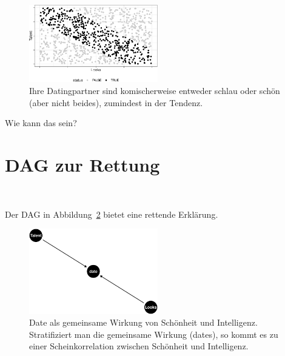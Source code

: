 \documentclass[
  a4paper,
  DIV=11]{scrreprt}
\theoremstyle{definition}
\theoremstyle{remark}
\begin{document}
\begin{figure}

{\centering \includegraphics[width=0.5\textwidth,height=\textheight]{./kausal_files/figure-pdf/fig-dates-beauty-1.pdf}

}

\caption{\label{fig-dates-beauty}Ihre Datingpartner sind komischerweise
entweder schlau oder schön (aber nicht beides), zumindest in der
Tendenz.}

\end{figure}

Wie kann das sein?

\hypertarget{dag-zur-rettung}{%
\section{DAG zur Rettung}\label{dag-zur-rettung}}

🦹 🦸

Der DAG in Abbildung~\ref{fig-coll1-dag} bietet eine rettende Erklärung.

\begin{figure}

{\centering \includegraphics[width=0.5\textwidth,height=\textheight]{./kausal_files/figure-pdf/fig-coll1-dag-1.pdf}

}

\caption{\label{fig-coll1-dag}Date als gemeinsame Wirkung von Schönheit
und Intelligenz. Stratifiziert man die gemeinsame Wirkung (dates), so
kommt es zu einer Scheinkorrelation zwischen Schönheit und Intelligenz.}

\end{figure}
\end{document}
